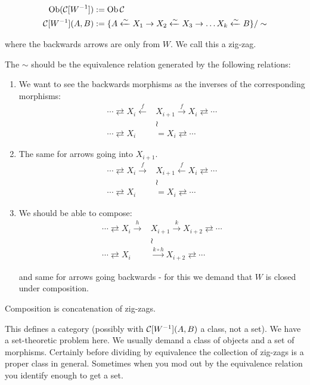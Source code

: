 \documentclass[class=report, crop=false,a4paper,twoside]{standalone}
\begin{document}
\begin{align*}
	\operatorname{Ob}(\mathcal{C}[W^{-1}]) &:= \operatorname{Ob}\mathcal{C} \\
	\mathcal{C}[W^{-1}](A,B) &:= \{A \xleftarrow{\sim} X_1 \to X_2 \xleftarrow{\sim} X_3 \to \dots X_k \xleftarrow{\sim} B\}/\sim
\end{align*}

 where the backwards arrows are only from $W$. We call this a zig-zag.

The $\sim$ should be the equivalence relation generated by the following relations:
\begin{enumerate}
	\item We want to see the backwards morphisms as the inverses of the corresponding morphisms:
	\begin{align*}
		\cdots \rightleftarrows X_i \xleftarrow{f} &X_{i+1} \xrightarrow{f} X_i \rightleftarrows \cdots\\
		&\wr\\
		\cdots \rightleftarrows X_i &= X_i \rightleftarrows \cdots
	\end{align*}

	\item The same for arrows going into $X_{i+1}$.
	\begin{align*}
		\cdots \rightleftarrows X_i \xrightarrow{f} &X_{i+1} \xleftarrow{f} X_i \rightleftarrows \cdots\\
		&\wr\\
		\cdots \rightleftarrows X_i &= X_i \rightleftarrows \cdots
	\end{align*}

	\item We should be able to compose:
	\begin{align*}
	\cdots \rightleftarrows X_i \xrightarrow{h} &X_{i+1} \xrightarrow{k} X_{i+2} \rightleftarrows \cdots\\
	&\wr\\
	\cdots \rightleftarrows X_i &\xrightarrow{k \circ h} X_{i+2} \rightleftarrows \cdots	
	\end{align*}

	and same for arrows going backwards - for this we demand that $W$ is closed under composition.
\end{enumerate}

Composition is concatenation of zig-zags.

\begin{exercise}
	This defines a category (possibly with $\mathcal{C}[W^{-1}](A,B)$ a class, not a set). We have a set-theoretic problem here. We usually demand a class of objects and a set of morphisms. Certainly before dividing by equivalence the collection of zig-zags is a proper class in general. Sometimes when you mod out by the equivalence relation you identify enough to get a set. 
\end{exercise}
\end{document}

